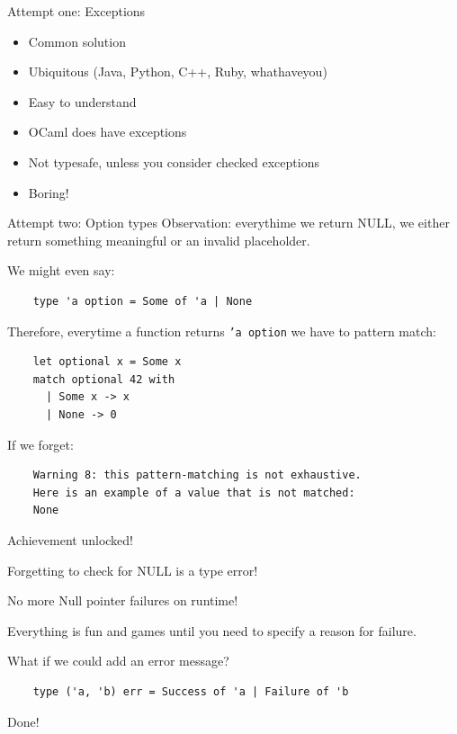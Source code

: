 \documentclass{beamer}
\begin{document}
\begin{frame}{Attempt one: Exceptions}
  \begin{itemize}
    \item Common solution
    \item Ubiquitous (Java, Python, C++, Ruby, whathaveyou)
    \item Easy to understand
    \item OCaml does have exceptions
    \pause
    \item \alert{Not typesafe}, unless you consider checked exceptions
    \item Boring!
  \end{itemize}
\end{frame}

\begin{frame}[fragile]{Attempt two: Option types}
  Observation: everythime we return NULL, we either return something
  meaningful or an invalid placeholder.

  We might even say:
  \begin{verbatim}
    type 'a option = Some of 'a | None
  \end{verbatim}

  \pause

  Therefore, everytime a function returns \texttt{'a option} we have
  to pattern match:
  \begin{verbatim}
    let optional x = Some x
    match optional 42 with
      | Some x -> x
      | None -> 0
  \end{verbatim}

  \pause

  If we forget:
  \begin{verbatim}
    Warning 8: this pattern-matching is not exhaustive.
    Here is an example of a value that is not matched:
    None
  \end{verbatim}
\end{frame}

\begin{frame}{Achievement unlocked!}
  \begin{center}
    {\Huge Forgetting to check for NULL is a type error!}
  \end{center}
  \checkmark No more Null pointer failures on runtime!
\end{frame}

\begin{frame}[fragile]
  Everything is fun and games until you need to specify a \alert{reason} for
  failure.

  What if we could add an error message?
  \begin{verbatim}
    type ('a, 'b) err = Success of 'a | Failure of 'b
  \end{verbatim}
  Done!
\end{frame}
\end{document}
